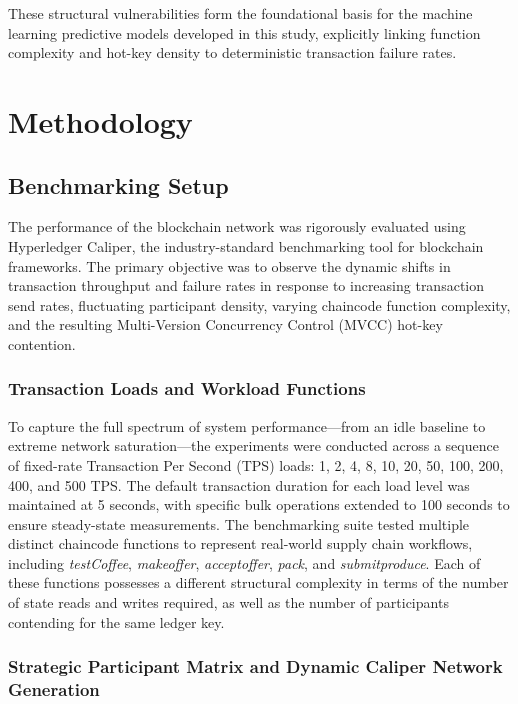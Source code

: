 \documentclass[12pt]{article}
\begin{document}
These structural vulnerabilities form the foundational basis for the machine learning predictive models developed in this study, explicitly linking function complexity and hot-key density to deterministic transaction failure rates.


\section{Methodology}

\subsection{Benchmarking Setup}



The performance of the blockchain network was rigorously evaluated using Hyperledger Caliper, the industry-standard benchmarking tool for blockchain frameworks. The primary objective was to observe the dynamic shifts in transaction throughput and failure rates in response to increasing transaction send rates, fluctuating participant density, varying chaincode function complexity, and the resulting Multi-Version Concurrency Control (MVCC) hot-key contention.

\subsubsection{Transaction Loads and Workload Functions}

To capture the full spectrum of system performance—from an idle baseline to extreme network saturation—the experiments were conducted across a sequence of fixed-rate Transaction Per Second (TPS) loads: 1, 2, 4, 8, 10, 20, 50, 100, 200, 400, and 500 TPS. The default transaction duration for each load level was maintained at 5 seconds, with specific bulk operations extended to 100 seconds to ensure steady-state measurements. The benchmarking suite tested multiple distinct chaincode functions to represent real-world supply chain workflows, including \textit{testCoffee}, \textit{makeoffer}, \textit{acceptoffer}, \textit{pack}, and \textit{submitproduce}. Each of these functions possesses a different structural complexity in terms of the number of state reads and writes required, as well as the number of participants contending for the same ledger key.

\subsubsection{Strategic Participant Matrix and Dynamic Caliper Network Generation}
\end{document}
